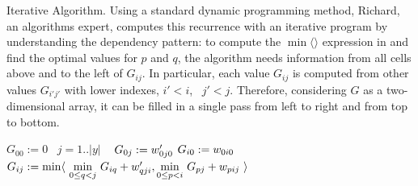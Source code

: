 \begin{paragraph}{Iterative Algorithm.}
Using a standard dynamic programming method, Richard, an algorithms expert, computes this recurrence
with an iterative program by understanding the dependency pattern:
to compute the $\min\langle\rangle$ expression in  and find the optimal
values for $p$ and $q$, the algorithm needs information from all cells above and to the left of $G_{ij}$.
In particular, each value $G_{ij}$ is computed from other values $G_{i'j'}$ with lower
indexes, $i'<i$, ~$j'<j$. 
Therefore, considering $G$ as a two-dimensional array, it can be filled in a single pass from left to right and from top
to bottom.
\end{paragraph}

\newcommand\FORLINE[1]{\STATE\algorithmicfor~{#1} \algorithmicdo~}

\begin{algorithm}
\renewcommand\arraystretch{1.3}
\begin{algorithmic}
  \STATE $G_{00} := 0$
  \FORLINE{$j=1..|y|$}  $G_{0j} := w'_{0j0}$  
    \STATE $G_{i0} := w_{0i0}$
      \STATE $G_{ij} :=
        \begin{array}[t]{@{}l@{~}l} 
          \min\langle & \underset{0\leq q<j}\min ~ G_{iq} + \yw{qji}, \underset{0\leq p<i}\min ~ G_{pj} + \xw{pij}~\rangle \\         
        \end{array}$
    \ENDFOR
  \ENDFOR
\end{algorithmic}
\caption{\label{intro:iterative}
   Iterative Simplified Arbiter}
\end{algorithm}


\newcommand\qbox[1]{\fbox{\scriptsize#1}}

